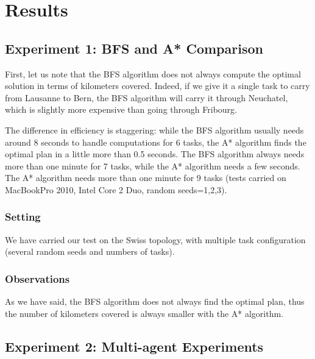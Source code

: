 \documentclass[11pt]{article}
\begin{document}
\section{Results}

\subsection{Experiment 1: BFS and A* Comparison}
First, let us note that the BFS algorithm does not always compute the optimal solution in terms of kilometers covered. Indeed, if we give it a single task to carry from Lausanne to Bern, the BFS algorithm will carry it through Neuchatel, which is slightly more expensive than going through Fribourg.

The difference in efficiency is staggering: while the BFS algorithm usually needs around 8 seconds to handle computations for 6 tasks, the A* algorithm finds the optimal plan in a little more than 0.5 seconds. The BFS algorithm always needs more than one minute for 7 tasks, while the A* algorithm needs a few seconds. The A* algorithm needs more than one minute for 9 tasks (tests carried on MacBookPro 2010, Intel Core 2 Duo, random seeds=1,2,3). 

\subsubsection{Setting}
We have carried our test on the Swiss topology, with multiple task configuration (several random seeds and numbers of tasks).

\subsubsection{Observations}
As we have said, the BFS algorithm does not always find the optimal plan, thus the number of kilometers covered is always smaller with the A* algorithm.

\subsection{Experiment 2: Multi-agent Experiments}
\end{document}
